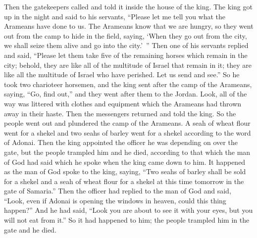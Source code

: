 \begin{biblechapter}
\verse Then the gatekeepers called and told it inside the house of the king.
\verse The king got up in the night and said to his servants, “Please let me tell you what the Arameans have done to us. The Arameans know that we are hungry, so they went out from the camp to hide in the field, saying, ‘When they go out from the city, we shall seize them alive and go into the city.’ ”
\verse Then one of his servants replied and said, “Please let them take five of the remaining horses which remain in the city; behold, they are like all of the multitude of Israel that remain in it; they are like all the multitude of Israel who have perished. Let us send and see.”
\verse So he took two charioteer horsemen, and the king sent after the camp of the Arameans, saying, “Go, find out,”
\verse and they went after them to the Jordan. Look, all of the way was littered with clothes and equipment which the Arameans had thrown away in their haste. Then the messengers returned and told the king.
 So the people went out and plundered the camp of the Arameans. A seah of wheat flour went for a shekel and two seahs of barley went for a shekel according to the word of Adonai.
\verse Then the king appointed the officer he was depending on over the gate, but the people trampled him and he died, according to that which the man of God had said which he spoke when the king came down to him.
\verse It happened as the man of God spoke to the king, saying, “Two seahs of barley shall be sold for a shekel and a seah of wheat flour for a shekel at this time tomorrow in the gate of Samaria.”
\verse Then the officer had replied to the man of God and said, “Look, even if Adonai is opening the windows in heaven, could this thing happen?” And he had said, “Look you are about to see it with your eyes, but you will not eat from it.”
\verse So it had happened to him; the people trampled him in the gate and he died.
\end{biblechapter}

